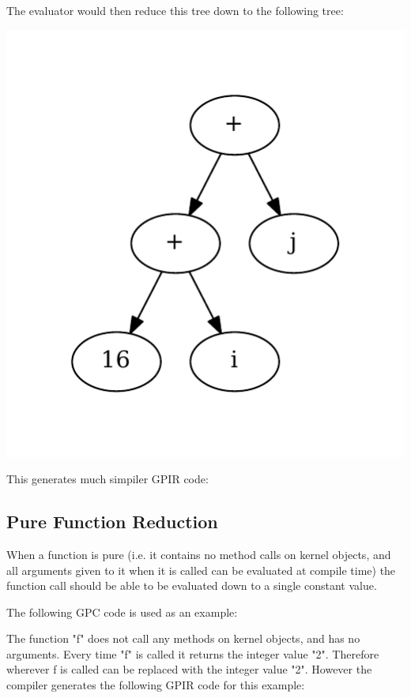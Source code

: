 The evaluator would then reduce this tree down to the following tree:

\begin{center}
\includegraphics[scale=0.5]{graphs/optimalFullyEvalTree.pdf}
\end{center}

This generates much simpiler GPIR code:
 


\subsection{Pure Function Reduction}

When a function is pure (i.e. it contains no method calls
on kernel objects, and all arguments given to it when it is called can be evaluated at 
compile time) the function call should be able to be evaluated down to a single constant value.

The following GPC code is used as an example:



The function "f" does not call any methods on kernel objects, and has no arguments.
Every time "f" is called it returns the integer value "2". Therefore wherever f is called can
be replaced with the integer value "2". However the compiler generates the following GPIR code
for this example:

